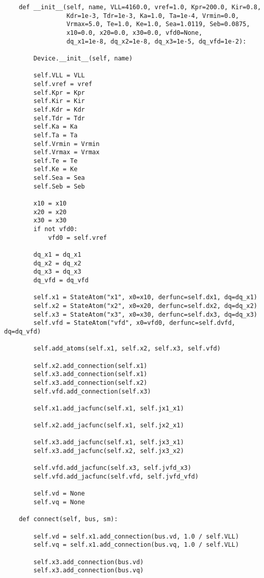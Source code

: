 \begin{lstlisting}
    def __init__(self, name, VLL=4160.0, vref=1.0, Kpr=200.0, Kir=0.8,
                 Kdr=1e-3, Tdr=1e-3, Ka=1.0, Ta=1e-4, Vrmin=0.0,
                 Vrmax=5.0, Te=1.0, Ke=1.0, Sea=1.0119, Seb=0.0875,
                 x10=0.0, x20=0.0, x30=0.0, vfd0=None,
                 dq_x1=1e-8, dq_x2=1e-8, dq_x3=1e-5, dq_vfd=1e-2):

        Device.__init__(self, name)

        self.VLL = VLL
        self.vref = vref
        self.Kpr = Kpr
        self.Kir = Kir
        self.Kdr = Kdr
        self.Tdr = Tdr
        self.Ka = Ka
        self.Ta = Ta
        self.Vrmin = Vrmin
        self.Vrmax = Vrmax
        self.Te = Te
        self.Ke = Ke
        self.Sea = Sea
        self.Seb = Seb

        x10 = x10
        x20 = x20
        x30 = x30
        if not vfd0:
            vfd0 = self.vref

        dq_x1 = dq_x1
        dq_x2 = dq_x2
        dq_x3 = dq_x3
        dq_vfd = dq_vfd

        self.x1 = StateAtom("x1", x0=x10, derfunc=self.dx1, dq=dq_x1)
        self.x2 = StateAtom("x2", x0=x20, derfunc=self.dx2, dq=dq_x2)
        self.x3 = StateAtom("x3", x0=x30, derfunc=self.dx3, dq=dq_x3)
        self.vfd = StateAtom("vfd", x0=vfd0, derfunc=self.dvfd, dq=dq_vfd)

        self.add_atoms(self.x1, self.x2, self.x3, self.vfd)

        self.x2.add_connection(self.x1)
        self.x3.add_connection(self.x1)
        self.x3.add_connection(self.x2)
        self.vfd.add_connection(self.x3)

        self.x1.add_jacfunc(self.x1, self.jx1_x1)

        self.x2.add_jacfunc(self.x1, self.jx2_x1)

        self.x3.add_jacfunc(self.x1, self.jx3_x1)
        self.x3.add_jacfunc(self.x2, self.jx3_x2)

        self.vfd.add_jacfunc(self.x3, self.jvfd_x3)
        self.vfd.add_jacfunc(self.vfd, self.jvfd_vfd)

        self.vd = None
        self.vq = None

    def connect(self, bus, sm):

        self.vd = self.x1.add_connection(bus.vd, 1.0 / self.VLL)
        self.vq = self.x1.add_connection(bus.vq, 1.0 / self.VLL)

        self.x3.add_connection(bus.vd)
        self.x3.add_connection(bus.vq)


\end{lstlisting}
